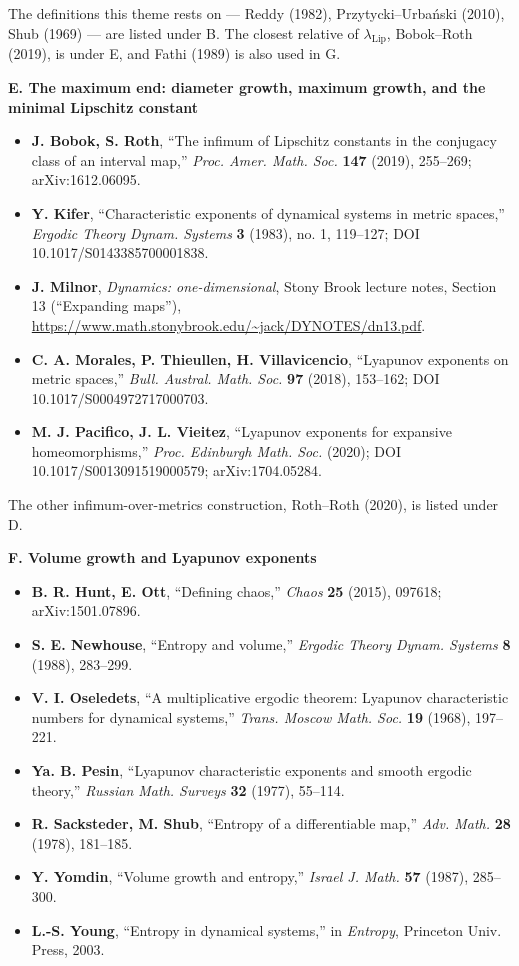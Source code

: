\documentclass[
]{article}
\providecommand{\tightlist}{%
  \setlength{\itemsep}{0pt}\setlength{\parskip}{0pt}}
\begin{document}
The definitions this theme rests on --- Reddy (1982),
Przytycki--Urba\'{n}ski (2010), Shub (1969) --- are listed under B. The
closest relative of \(\lambda_{\mathrm{Lip}}\), Bobok--Roth (2019), is
under E, and Fathi (1989) is also used in G.

\textbf{E. The maximum end: diameter growth, maximum growth, and the
minimal Lipschitz constant}

\begin{itemize}
\tightlist
\item
  \textbf{J. Bobok, S. Roth}, ``The infimum of Lipschitz constants in
  the conjugacy class of an interval map,'' \emph{Proc. Amer. Math.
  Soc.} \textbf{147} (2019), 255--269; arXiv:1612.06095.
\item
  \textbf{Y. Kifer}, ``Characteristic exponents of dynamical systems in
  metric spaces,'' \emph{Ergodic Theory Dynam. Systems} \textbf{3}
  (1983), no. 1, 119--127; DOI 10.1017/S0143385700001838.
\item
  \textbf{J. Milnor}, \emph{Dynamics: one-dimensional}, Stony Brook
  lecture notes, Section 13 (``Expanding maps''),
  \url{https://www.math.stonybrook.edu/~jack/DYNOTES/dn13.pdf}.
\item
  \textbf{C. A. Morales, P. Thieullen, H. Villavicencio}, ``Lyapunov
  exponents on metric spaces,'' \emph{Bull. Austral. Math. Soc.}
  \textbf{97} (2018), 153--162; DOI 10.1017/S0004972717000703.
\item
  \textbf{M. J. Pacifico, J. L. Vieitez}, ``Lyapunov exponents for
  expansive homeomorphisms,'' \emph{Proc. Edinburgh Math. Soc.} (2020);
  DOI 10.1017/S0013091519000579; arXiv:1704.05284.
\end{itemize}

The other infimum-over-metrics construction, Roth--Roth (2020), is
listed under D.

\textbf{F. Volume growth and Lyapunov exponents}

\begin{itemize}
\tightlist
\item
  \textbf{B. R. Hunt, E. Ott}, ``Defining chaos,'' \emph{Chaos}
  \textbf{25} (2015), 097618; arXiv:1501.07896.
\item
  \textbf{S. E. Newhouse}, ``Entropy and volume,'' \emph{Ergodic Theory
  Dynam. Systems} \textbf{8} (1988), 283--299.
\item
  \textbf{V. I. Oseledets}, ``A multiplicative ergodic theorem: Lyapunov
  characteristic numbers for dynamical systems,'' \emph{Trans. Moscow
  Math. Soc.} \textbf{19} (1968), 197--221.
\item
  \textbf{Ya. B. Pesin}, ``Lyapunov characteristic exponents and smooth
  ergodic theory,'' \emph{Russian Math. Surveys} \textbf{32} (1977),
  55--114.
\item
  \textbf{R. Sacksteder, M. Shub}, ``Entropy of a differentiable map,''
  \emph{Adv. Math.} \textbf{28} (1978), 181--185.
\item
  \textbf{Y. Yomdin}, ``Volume growth and entropy,'' \emph{Israel J.
  Math.} \textbf{57} (1987), 285--300.
\item
  \textbf{L.-S. Young}, ``Entropy in dynamical systems,'' in
  \emph{Entropy}, Princeton Univ. Press, 2003.
\end{itemize}
\end{document}
